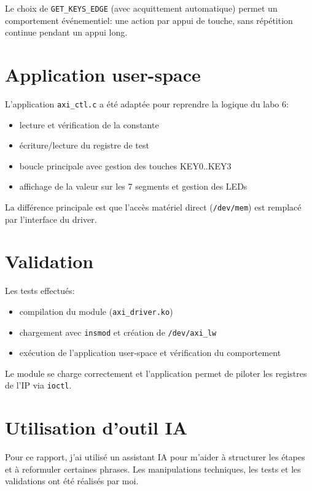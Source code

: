 \documentclass[a4paper,12pt]{article}
\begin{document}
Le choix de \texttt{GET\_KEYS\_EDGE} (avec acquittement automatique) permet un
comportement événementiel: une action par appui de touche, sans répétition
continue pendant un appui long.

\section{Application user-space}
L'application \texttt{axi\_ctl.c} a été adaptée pour reprendre la logique du
labo 6:
\begin{itemize}
    \item lecture et vérification de la constante
    \item écriture/lecture du registre de test
    \item boucle principale avec gestion des touches KEY0..KEY3
    \item affichage de la valeur sur les 7 segments et gestion des LEDs
\end{itemize}

La différence principale est que l'accès matériel direct (\texttt{/dev/mem})
est remplacé par l'interface du driver.

\section{Validation}
Les tests effectués:
\begin{itemize}
    \item compilation du module (\texttt{axi\_driver.ko})
    \item chargement avec \texttt{insmod} et création de \texttt{/dev/axi\_lw}
    \item exécution de l'application user-space et vérification du comportement
\end{itemize}

Le module se charge correctement et l'application permet de piloter les
registres de l'IP via \texttt{ioctl}.


\newpage

\section{Utilisation d'outil IA}

Pour ce rapport, j'ai utilisé un assistant IA pour m'aider à structurer les étapes et à reformuler certaines phrases. Les manipulations techniques, les tests et les validations ont été réalisés par moi.
\end{document}
